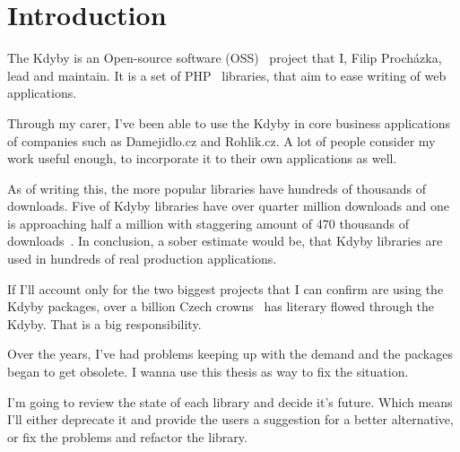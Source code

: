\chapter{Introduction}

The Kdyby is an Open-source software (OSS)~\cite{wiki:oss} project that I, Filip Procházka, lead and maintain. It is a set of PHP~\cite{wiki:php} libraries, that aim to ease writing of web applications.

Through my carer, I've been able to use the Kdyby in core business applications of companies such as Damejidlo.cz and Rohlik.cz. A lot of people consider my work useful enough, to incorporate it to their own applications as well.

As of writing this, the more popular libraries have hundreds of thousands of downloads. Five of Kdyby libraries have over quarter million downloads and one is approaching half a million with staggering amount of 470 thousands of downloads~\cite{packagist:kdyby}. In conclusion, a sober estimate would be, that Kdyby libraries are used in hundreds of real production applications.

If I'll account only for the two biggest projects that I can confirm are using the Kdyby packages, over a billion Czech crowns~\cite{tyinternety:rohlik-billion} has literary flowed through the Kdyby. That is a big responsibility.

Over the years, I've had problems keeping up with the demand and the packages began to get obsolete. I wanna use this thesis as way to fix the situation.

I'm going to review the state of each library and decide it's future. Which means I'll either deprecate it and provide the users a suggestion for a better alternative, or fix the problems and refactor the library.
